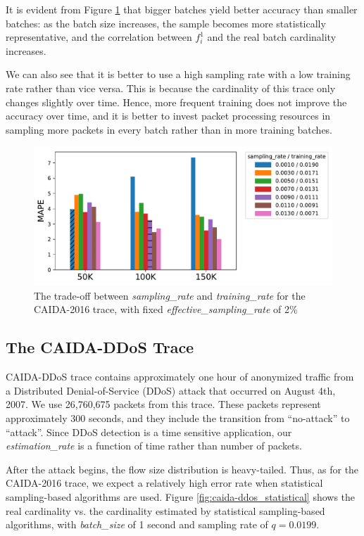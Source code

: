 It is evident from Figure \ref{fig:caida-2016_sampling_training} that bigger batches yield better accuracy than smaller batches: as the batch size increases, the sample becomes more statistically representative, and the correlation between $f_i^1$ and the real batch cardinality increases. 
		
We can also see that it is better to use a high sampling rate with a low training rate rather than vice versa. This is because the cardinality of this trace only changes slightly over time. Hence, more frequent training does not improve the accuracy over time, and it is better to invest packet processing resources in sampling more packets in every batch rather than in more training batches.
		
		\begin{figure}[!t]
			\centering
			\includegraphics[width=.49\textwidth]{img/caida-2016_tradeoff_new.pdf}
			\caption{The trade-off between \emph{sampling\_rate} and \emph{training\_rate} for the CAIDA-2016 trace, with fixed \emph{effective\_sampling\_rate} of 2\%} 
			\label{fig:caida-2016_sampling_training}
		\end{figure}

	\subsection{The CAIDA-DDoS Trace}

		CAIDA-DDoS trace \cite{caidaddos2007} contains approximately one hour of anonymized traffic from a Distributed Denial-of-Service (DDoS) attack that occurred on August 4th, 2007. We use 26,760,675 packets from this trace. These packets represent approximately 300 seconds, and they include the transition from ``no-attack'' to ``attack''. Since DDoS detection is a time sensitive application, our \emph{estimation\_rate} is a function of time rather than number of packets.
		
		After the attack begins, the flow size distribution is heavy-tailed. Thus, as for the CAIDA-2016 trace, we expect a relatively high error rate when statistical sampling-based algorithms are used. Figure \ref{fig:caida-ddos_statistical} shows the real cardinality vs. the cardinality estimated by statistical sampling-based algorithms, with \emph{batch\_size} of 1 second and sampling rate of $q=0.0199$.
		

